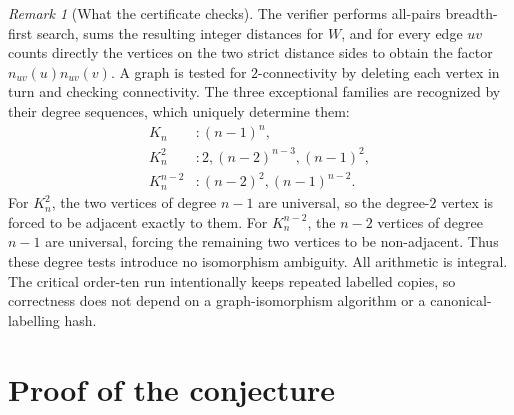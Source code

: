 \documentclass[11pt,reqno]{amsart}
\theoremstyle{definition}
\theoremstyle{remark}
\newtheorem{remark}[remark]{Remark}
\begin{document}
\begin{remark}[What the certificate checks]\label{rem:certificate}
The verifier performs all-pairs breadth-first search, sums the resulting
integer distances for $W$, and for every edge $uv$ counts directly the
vertices on the two strict distance sides to obtain the factor
$n_{uv}(u)n_{uv}(v)$.  A graph is tested for $2$-connectivity by deleting each
vertex in turn and checking connectivity.  The three exceptional families are
recognized by their degree sequences, which uniquely determine them:
\[
\begin{aligned}
 K_n &: (n-1)^n,\\
 K_n^2 &: 2,(n-2)^{n-3},(n-1)^2,\\
 K_n^{n-2} &: (n-2)^2,(n-1)^{n-2}.
\end{aligned}
\]
For $K_n^2$, the two vertices of degree $n-1$ are universal, so the
degree-$2$ vertex is forced to be adjacent exactly to them.  For
$K_n^{n-2}$, the $n-2$ vertices of degree $n-1$ are universal, forcing the
remaining two vertices to be non-adjacent.  Thus these degree tests introduce
no isomorphism ambiguity.  All arithmetic is integral.  The critical order-ten
run intentionally keeps
repeated labelled copies, so correctness does not depend on a graph-isomorphism
algorithm or a canonical-labelling hash.
\end{remark}

\section{Proof of the conjecture}\label{sec:proof}
\end{document}

